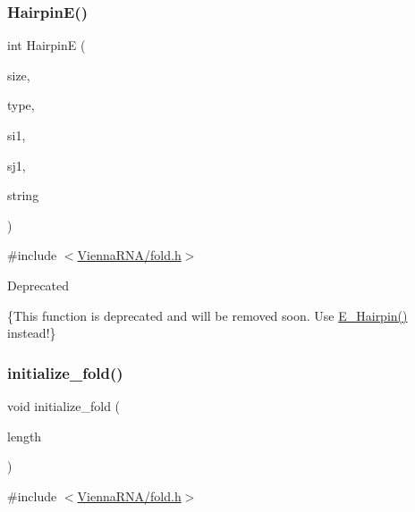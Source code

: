 \subsubsection{\texorpdfstring{Hairpin\+E()}{HairpinE()}}
{\footnotesize\ttfamily int HairpinE (\begin{DoxyParamCaption}\item[{int}]{size,  }\item[{int}]{type,  }\item[{int}]{si1,  }\item[{int}]{sj1,  }\item[{const char $\ast$}]{string }\end{DoxyParamCaption})}



{\ttfamily \#include $<$\mbox{\hyperlink{fold_8h}{Vienna\+R\+N\+A/fold.\+h}}$>$}

\begin{DoxyRefDesc}{Deprecated}
\item[\mbox{\hyperlink{deprecated__deprecated000081}{Deprecated}}]\{This function is deprecated and will be removed soon. Use \mbox{\hyperlink{group__loops_gadf943ee9a45b7f4cee9192c06210dace}{E\+\_\+\+Hairpin()}} instead!\} \end{DoxyRefDesc}
\mbox{\label{group__mfe__fold__single_gac3f0a28d9cb609d388b155445073fd20}} 
\subsubsection{\texorpdfstring{initialize\+\_\+fold()}{initialize\_fold()}}
{\footnotesize\ttfamily void initialize\+\_\+fold (\begin{DoxyParamCaption}\item[{int}]{length }\end{DoxyParamCaption})}



{\ttfamily \#include $<$\mbox{\hyperlink{fold_8h}{Vienna\+R\+N\+A/fold.\+h}}$>$}

